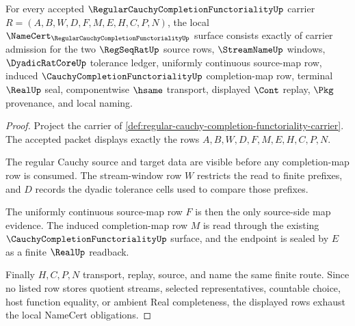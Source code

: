 \begin{theorem}
\label{thm:regular-cauchy-completion-functoriality-namecert-obligations}
For every accepted $\RegularCauchyCompletionFunctorialityUp$ carrier $R=(A,B,W,D,F,M,E,H,C,P,N)$, the local $\NameCert_{\RegularCauchyCompletionFunctorialityUp}$ surface consists exactly of carrier admission for the two $\RegSeqRatUp$ source rows, $\StreamNameUp$ windows, $\DyadicRatCoreUp$ tolerance ledger, uniformly continuous source-map row, induced $\CauchyCompletionFunctorialityUp$ completion-map row, terminal $\RealUp$ seal, componentwise $\hsame$ transport, displayed $\Cont$ replay, $\Pkg$ provenance, and local naming.
\end{theorem}
\begin{proof}
Project the carrier of \autoref{def:regular-cauchy-completion-functoriality-carrier}. The accepted packet displays exactly the rows $A,B,W,D,F,M,E,H,C,P,N$.

The regular Cauchy source and target data are visible before any completion-map row is consumed. The stream-window row $W$ restricts the read to finite prefixes, and $D$ records the dyadic tolerance cells used to compare those prefixes.

The uniformly continuous source-map row $F$ is then the only source-side map evidence. The induced completion-map row $M$ is read through the existing $\CauchyCompletionFunctorialityUp$ surface, and the endpoint is sealed by $E$ as a finite $\RealUp$ readback.

Finally $H,C,P,N$ transport, replay, source, and name the same finite route. Since no listed row stores quotient streams, selected representatives, countable choice, host function equality, or ambient Real completeness, the displayed rows exhaust the local NameCert obligations.
\end{proof}

